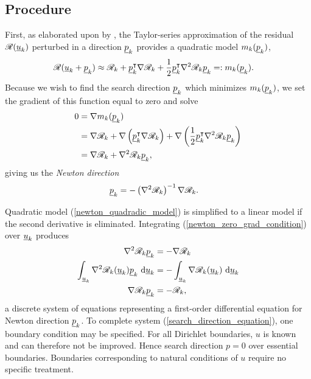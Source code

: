 \subsection{Procedure}

First, as elaborated upon by \citet{nocedal_2000}, the Taylor-series approximation of the residual $\mathscr{R}(\underline{u}_k)$ perturbed in a direction $\underline{p}_k$ provides a quadratic model $m_k(\underline{p}_k)$,
\begin{align}
  \label{newton_quadradic_model}
  \mathscr{R}(\underline{u}_k + \underline{p}_k) &\approx \mathscr{R}_k + \underline{p}_k^\intercal \nabla \mathscr{R}_k + \frac{1}{2} \underline{p}_k^\intercal \nabla^2 \mathscr{R}_k \underline{p}_k =: m_k(\underline{p}_k).
\end{align}
Because we wish to find the search direction $\underline{p}_k$ which minimizes $m_k(\underline{p}_k)$, we set the gradient of this function equal to zero and solve
\begin{align}
  0 &= \nabla m_k(\underline{p}_k) \notag \\
    &= \nabla \mathscr{R}_k + \nabla \left( \underline{p}_k^\intercal \nabla \mathscr{R}_k \right) + \nabla \left( \frac{1}{2} \underline{p}_k^\intercal \nabla^2 \mathscr{R}_k \underline{p}_k \right) \notag \\
    \label{newton_zero_grad_condition}
    &= \nabla \mathscr{R}_k + \nabla^2 \mathscr{R}_k \underline{p}_k,
\end{align}
giving us the \emph{Newton direction}
\begin{align}
  \label{newton_direction}
  \underline{p}_k &= -\left( \nabla^2 \mathscr{R}_k \right)^{-1} \nabla \mathscr{R}_k.
\end{align}

Quadratic model (\ref{newton_quadradic_model}) is simplified to a linear model if the second derivative is eliminated.  Integrating (\ref{newton_zero_grad_condition}) over $\underline{u}_k$ produces
\begin{align}
  \label{search_direction_equation}
  \nabla^2 \mathscr{R}_k \underline{p}_k &= - \nabla \mathscr{R}_k \notag \\
  \int_{\underline{u}_k} \nabla^2 \mathscr{R}_k(\underline{u}_k) \underline{p}_k \ \mathrm{d}\underline{u}_k &= - \int_{\underline{u}_k} \nabla \mathscr{R}_k(\underline{u}_k) \ \mathrm{d}\underline{u}_k \notag \\
  \nabla \mathscr{R}_k \underline{p}_k &= - \mathscr{R}_k,
\end{align}
a discrete system of equations representing a first-order differential equation for Newton direction $\underline{p}_k$.  To complete system (\ref{search_direction_equation}), one boundary condition may be specified.  For all Dirichlet boundaries, $u$ is known and can therefore not be improved.  Hence search direction $p = 0$ over essential boundaries.  Boundaries corresponding to natural conditions of $u$ require no specific treatment.

